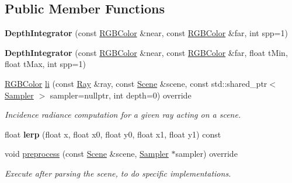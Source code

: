 \subsection*{Public Member Functions}
\begin{DoxyCompactItemize}
\item 
\mbox{\label{classomg_1_1_depth_integrator_a8a48035369453b21bc75bebd39e5d195}} 
{\bfseries Depth\+Integrator} (const \mbox{\hyperlink{namespaceomg_a7b0e3f3dcf76f2b4758c314a41885917}{R\+G\+B\+Color}} \&near, const \mbox{\hyperlink{namespaceomg_a7b0e3f3dcf76f2b4758c314a41885917}{R\+G\+B\+Color}} \&far, int spp=1)
\item 
\mbox{\label{classomg_1_1_depth_integrator_aa2a8505057af57cdf7c5c93b2f69b9c3}} 
{\bfseries Depth\+Integrator} (const \mbox{\hyperlink{namespaceomg_a7b0e3f3dcf76f2b4758c314a41885917}{R\+G\+B\+Color}} \&near, const \mbox{\hyperlink{namespaceomg_a7b0e3f3dcf76f2b4758c314a41885917}{R\+G\+B\+Color}} \&far, float t\+Min, float t\+Max, int spp=1)
\item 
\mbox{\hyperlink{namespaceomg_a7b0e3f3dcf76f2b4758c314a41885917}{R\+G\+B\+Color}} \mbox{\hyperlink{classomg_1_1_depth_integrator_a91ac6f83b0a56e67f754457f7d2f4365}{li}} (const \mbox{\hyperlink{classomg_1_1_ray}{Ray}} \&ray, const \mbox{\hyperlink{classomg_1_1_scene}{Scene}} \&scene, const std\+::shared\+\_\+ptr$<$ \mbox{\hyperlink{classomg_1_1_sampler}{Sampler}} $>$ sampler=nullptr, int depth=0) override
\begin{DoxyCompactList}\small\item\em Incidence radiance computation for a given ray acting on a scene. \end{DoxyCompactList}\item 
\mbox{\label{classomg_1_1_depth_integrator_aae1bb28843a58312e98c6ba2f7ed6ef1}} 
float {\bfseries lerp} (float x, float x0, float y0, float x1, float y1) const
\item 
void \mbox{\hyperlink{classomg_1_1_depth_integrator_a4ef7ff8e7499862d1416eda91b5ec2f1}{preprocess}} (const \mbox{\hyperlink{classomg_1_1_scene}{Scene}} \&scene, \mbox{\hyperlink{classomg_1_1_sampler}{Sampler}} $\ast$sampler) override
\begin{DoxyCompactList}\small\item\em Execute after parsing the scene, to do specific implementations. \end{DoxyCompactList}\end{DoxyCompactItemize}
